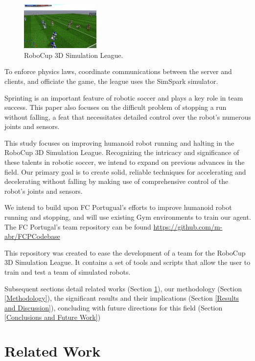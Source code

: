 \documentclass[conference]{IEEEtran}
\begin{document}
\begin{figure}[htbp]
    \centerline{\includegraphics[width=0.35\textwidth]{images/robocup3d.png}}
    \caption{RoboCup 3D Simulation League.}
    \label{fig:robocup3d}
\end{figure}

To enforce physics laws, coordinate communications between the server and clients, and officiate the game, the league uses the SimSpark simulator.

Sprinting is an important feature of robotic soccer and plays a key role in team success. This paper also focuses on the difficult problem of stopping a run without falling, a feat that necessitates detailed control over the robot's numerous joints and sensors.

This study focuses on improving humanoid robot running and halting in the RoboCup 3D Simulation League.
Recognizing the intricacy and significance of these talents in robotic soccer, we intend to expand on previous advances in the field.
Our primary goal is to create solid, reliable techniques for accelerating and decelerating without falling by making use of comprehensive control
of the robot's joints and sensors.

We intend to build upon FC Portugual's efforts to improve humanoid robot running and stopping, and will use existing Gym environments to train our agent.
The FC Portugal's team repository can be found \href{https://github.com/m-abr/FCPCodebase}{https://github.com/m-abr/FCPCodebase}

This repository was created to ease the development of a team for the RoboCup 3D Simulation League.
It contains a set of tools and scripts that allow the user to train and test a team of simulated robots.

Subsequent sections detail related works (Section \ref{Related Work}), our methodology (Section \ref{Methodology}),
the significant results and their implications (Section \ref{Results and Discussion}),
concluding with future directions for this field (Section \ref{Conclusions and Future Work})

\section{Related Work}\label{Related Work}
\end{document}
